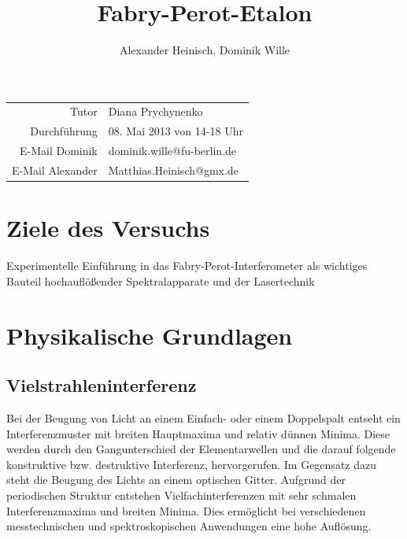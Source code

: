 \documentclass{article}
\title{Fabry-Perot-Etalon}
\author{Alexander Heinisch, Dominik Wille}
\begin{document}
\maketitle

\begin{center}
\begin{minipage}{\linewidth}
\centering
{}
\label{ringe}
\end{minipage}
\end{center}
\vspace{7cm}
\noindent
\begin{center}
\begin{tabular}{r l}
Tutor & Diana Prychynenko  \\
Durchführung & 08. Mai 2013 von 14-18 Uhr\\

E-Mail Dominik & dominik.wille@fu-berlin.de \\
E-Mail Alexander & Matthias.Heinisch@gmx.de \\
\end{tabular}
\end{center}

\newpage
\tableofcontents
\newpage

\section{Ziele des Versuchs}
Experimentelle Einführung in das {\sc Fabry-Perot-Interferometer} als wichtiges Bauteil hochauflößender Spektralapparate und der Lasertechnik \\

\section{Physikalische Grundlagen}

\subsection{Vielstrahleninterferenz}
Bei der Beugung von Licht an einem Einfach- oder einem Doppelspalt entseht ein Interferenzmuster mit breiten Hauptmaxima und relativ dünnen Minima. Diese werden durch den Gangunterschied der Elementarwellen und die darauf folgende konstruktive bzw. destruktive Interferenz, hervorgerufen. Im Gegensatz dazu steht die Beugung des Lichts an einem optischen Gitter. Aufgrund der periodischen Struktur entstehen Vielfachinterferenzen mit sehr schmalen Interferenzmaxima und breiten Minima. Dies ermöglicht bei verschiedenen messtechnischen und spektroskopischen Anwendungen eine hohe Auflösung. 
\end{document}
